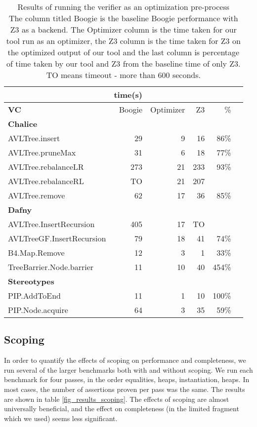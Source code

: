 \begin{table}
\centering
\scriptsize
\begin{tabular}{|l||r|r|r||r|r|}
\hline
                           &  \textbf{time(s)} &   & & \\
\hline
\textbf{VC}                &  Boogie & Optimizer & Z3 & \% \\

\hline
\textbf{Chalice} &&&&\\
\hline
 AVLTree.insert                 &  29 &   9 &  16 &  86\%\\
\hline
AVLTree.pruneMax               &  31 &   6 &  18 &  77\%\\
\hline
AVLTree.rebalanceLR            & 273 &  21 & 233 &  93\%\\
\hline
AVLTree.rebalanceRL            &  TO &  21 & 207 & \\
\hline
AVLTree.remove                 &  62 &  17 &  36 &  85\%\\
\hline
\textbf{Dafny} &&&&\\
\hline
AVLTree.InsertRecursion              & 405 &  17 &  TO &  \\
\hline
AVLTreeGF.InsertRecursion          &  79 &  18 &  41 &  74\%\\
\hline
B4.Map.Remove                                      &  12 &   3 &   1 &  33\%\\
\hline
TreeBarrier.Node.barrier                           &  11 &  10 &  40 & 454\%\\
\hline
\textbf{Stereotypes   } &&&&\\
\hline
PIP.AddToEnd                               &  11 &   1 &  10 & 100\%\\
\hline
PIP.Node.acquire                          &  64 &   3 &  35 &  59\%\\
\hline
\end{tabular}
\caption{Results of running the verifier as an optimization pre-process\\
The column titled Boogie is the baseline Boogie performance with Z3 as a backend. 
The Optimizer column is the time taken for our tool run as an optimizer, 
the Z3 column is the time taken for Z3 on the optimized output of our tool 
and the last column is percentage of time taken by our tool and Z3 from the baseline time of only Z3.
TO means timeout - more than 600 seconds.}
\label{fig_results_overall}
\end{table}


\subsection*{Scoping}
In order to quantify the effects of scoping on performance and completeness, we run several of the larger benchmarks both with and without scoping. We run each benchmark for four passes, in the order equalities, heaps, instantiation, heaps.
In most cases, the number of assertions proven per pass was the same.
The results are shown in table \ref{fig_results_scoping}. 
The effects of scoping are almost universally beneficial, and the effect on completeness (in the limited fragment which we used) seems less significant.

